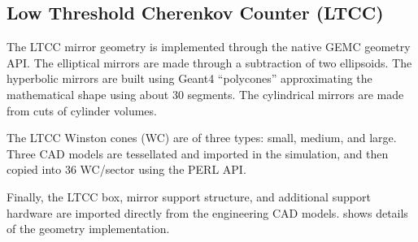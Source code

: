 \subsection{Low Threshold Cherenkov Counter (LTCC)}

The LTCC mirror geometry is implemented through the native GEMC geometry API.
The elliptical mirrors are made through a subtraction of two ellipsoids.
The hyperbolic mirrors are built using Geant4 ``polycones'' approximating the mathematical shape using about 30 segments.
The cylindrical mirrors are made from cuts of cylinder volumes.

The LTCC Winston cones (WC) are of three types: small, medium, and large. Three CAD models are tessellated and
imported in the simulation, and then copied into 36 WC/sector using the PERL API.

Finally, the LTCC box, mirror support structure, and additional support hardware are imported directly from
the engineering CAD models.  shows details of the geometry implementation.

